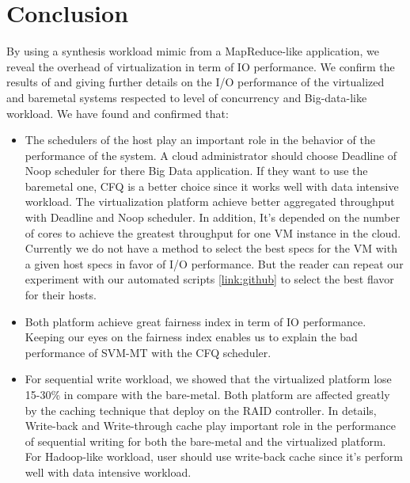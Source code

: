 \documentclass{acmsig}
\begin{document}





\section{Conclusion}
By using a synthesis workload mimic from a MapReduce-like application, we reveal the overhead of virtualization in term of IO performance. We confirm the results of \cite{kvmperformance2013,ioschedulerpasse2010} and giving further details on the I/O performance of the virtualized and baremetal systems respected to level of concurrency and Big-data-like workload. We have found and confirmed that:
\begin{itemize}
  \item The schedulers of the host play an important role in the behavior of the performance of the system. A cloud administrator should choose Deadline of Noop scheduler for there Big Data application. If they want to use the baremetal one, CFQ is a better choice since it works well with data intensive workload. The virtualization platform achieve better aggregated throughput with Deadline and Noop scheduler. In addition, It's depended on the number of cores to achieve the greatest throughput for one VM instance in the cloud. Currently we do not have a method to select the best specs for the VM with a given host specs in favor of I/O performance. But the reader can repeat our experiment with our automated scripts \ref{link:github} to select the best flavor for their hosts.
  \item Both platform achieve great fairness index in term of IO performance. Keeping our eyes on the fairness index enables us to explain the bad performance of SVM-MT with the CFQ scheduler.
  \item For sequential write workload, we showed that the virtualized platform lose 15-30\% in compare with the bare-metal. Both platform are affected greatly by the caching technique that deploy on the RAID controller. In details, Write-back and Write-through cache play important role in the performance of sequential writing for both the bare-metal and the virtualized platform. For Hadoop-like workload, user should use write-back cache since it's perform well with data intensive workload.
\end{itemize}
\end{document}
